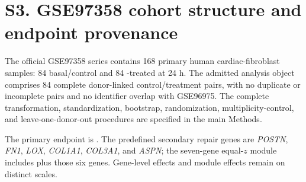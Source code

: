 \documentclass[11pt]{article}
\begin{document}
\section*{S3. GSE97358 cohort structure and endpoint provenance}
The official GSE97358 series contains 168 primary human cardiac-fibroblast samples: 84 basal/control and 84 \tgfb{}-treated at 24 h. The admitted analysis object comprises 84 complete donor-linked control/treatment pairs, with no duplicate or incomplete pairs and no identifier overlap with GSE96975. The complete transformation, standardization, bootstrap, randomization, multiplicity-control, and leave-one-donor-out procedures are specified in the main Methods.

The primary endpoint is \cthrc{}. The predefined secondary repair genes are \textit{POSTN}, \textit{FN1}, \textit{LOX}, \textit{COL1A1}, \textit{COL3A1}, and \textit{ASPN}; the seven-gene equal-$z$ module includes \cthrc{} plus those six genes. Gene-level effects and module effects remain on distinct scales.
\end{document}
